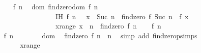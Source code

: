 \begin{isabellebody}
\begin{figure}
\begin{minipage}{0.8\textwidth}
\ \ \isamarkupfalse%
\ f\ n\ \isamarkupfalse%
\ dom{}\ {}findzero{}dom\ {}f{}\ n{}{}\isanewline
\ \ \ \ \ \ \ \ \ \ \ \ \ \ \ \ IH{}\ {}{}f\ n\ {}\ {}{}\ x\ {}\ {}Suc\ n\ {}{}{}\ findzero\ f\ {}Suc\ n{}{}{}\ {}\ f\ x\ {}\ {}{}\isanewline
\ \ \ \ \ \ \ \ \ \ \ \ \ \ \ \ x{}range{}\ {}x\ {}\ {}n\ {}{}{}\ findzero\ f\ n{}{}\isanewline
\ \ \isamarkupfalse%
\ {}f\ n\ {}\ {}{}\isanewline
\ \ \isamarkupfalse%
\ \isanewline
\ \ \ \ \isamarkupfalse%
\ {}f\ n\ {}\ {}{}\isanewline
\ \ \ \ \isamarkupfalse%
\ dom\ \isamarkupfalse%
\ {}findzero\ f\ n\ {}\ n{}\ \isamarkupfalse%
\ {}simp\ add{}\ findzero{}psimps{}\isanewline
\ \ \ \ \isamarkupfalse%
\ x{}range\ \isamarkupfalse%

\end{minipage}
\end{figure}
\end{isabellebody}
